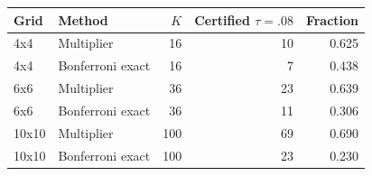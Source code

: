 \begin{tabular}{llrrr}
\toprule
Grid & Method & $K$ & Certified $\tau=.08$ & Fraction \\
\midrule
4x4 & Multiplier & 16 & 10 & 0.625 \\
4x4 & Bonferroni exact & 16 & 7 & 0.438 \\
6x6 & Multiplier & 36 & 23 & 0.639 \\
6x6 & Bonferroni exact & 36 & 11 & 0.306 \\
10x10 & Multiplier & 100 & 69 & 0.690 \\
10x10 & Bonferroni exact & 100 & 23 & 0.230 \\
\bottomrule
\end{tabular}
